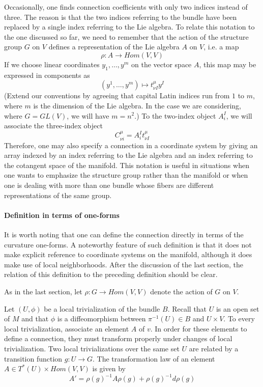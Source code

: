 \documentclass[12pt]{article}
\begin{document}
Occasionally, one finds connection coefficients with only two indices instead of three.  The reason is that the two indices referring to the bundle have been replaced by a single index referring to the Lie algebra.  To relate this notation to the one discussed so far, we need to remember that the action of the structure group $G$ on $V$ defines a representation of the Lie algebra $A$ on $V$, i.e. a map
 $$\rho \colon A \to Hom (V,V)$$
If we choose linear coordinates $y_1, \ldots ,y^m$ on the vector space $A$, this map may be expressed in components as
 $$(y^1, \ldots ,y^m) \mapsto t^\mu_{\nu I} y^I$$
(Extend our conventions by agreeing that capital Latin indices run from $1$ to $m$, where $m$ is the dimension of the Lie algebra.  In the case we are considering, where $G = GL(V)$, we will have $m = n^2$.)  To the two-index object $A^I_i$, we will associate the three-index object
 $$C^\mu_{\nu i} = A^I_i t^\mu_{\nu I}$$
Therefore, one may also specify a connection in a coordinate system by giving an array indexed by an index referring to the Lie algebra and an index referring to the cotangent space of the manifold.  This notation is useful in situations when one wants to emphasize the structure group rather than the manifold or when one is dealing with more than one bundle whose fibers are different representations of the same group.

\paragraph{Definition in terms of one-forms}
It is worth noting that one can define the connection directly in terms of the curvature one-forms.  A noteworthy feature of such definition is that it does not make explicit reference to coordinate systems on the manifold, although it does make use of local neighborhoods.  After the discussion of the last section, the relation of this definition to the preceding definition should be clear.

As in the last section, let $\rho \colon G \to Hom(V,V)$ denote the action of $G$ on $V$.

Let $(U,\phi)$ be a local trivialization of the bundle $B$.  Recall that $U$ is an open set of $M$ and that $\phi$ is a diffeomorphism between $\pi^{-1} (U) \in B$ and $U \times V$.  To every local trivialization, associate an element $A$ of $v$.  In order for these elements to define a connection, they must transform properly under changes of local trivialization.  Two local trivializations over the same set $U$ are related by a transition function $g \colon U \to G$.   The transformation law of an element $A \in T^*(U) \times Hom(V,V)$ is given by
 $$A' = \rho (g)^{-1} A \rho (g) +  \rho (g)^{-1} d \rho (g)$$
\end{document}
